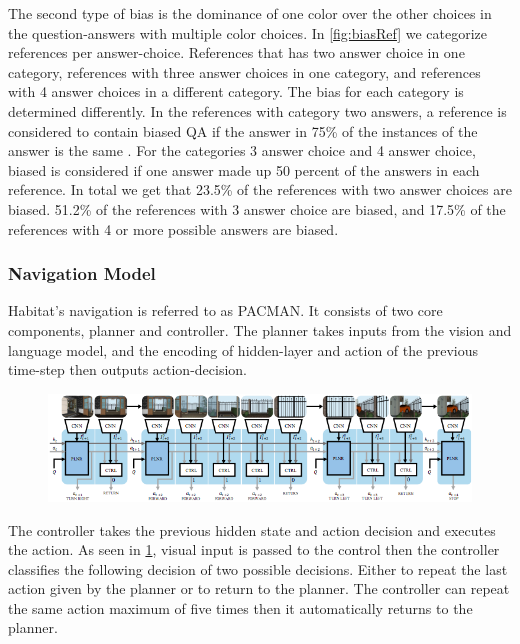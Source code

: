 The second type of bias is the dominance of one color over the other choices in the question-answers with multiple color choices. In \ref{fig:biasRef} we categorize references per answer-choice. References that has two answer choice in one category, references with three answer choices in one category, and references with 4 answer choices in a different category. The bias for each category is determined differently. In the references with category two answers, a reference is considered to contain biased QA if the answer in 75\% of the instances of the answer is the same . For the categories 3 answer choice and 4 answer choice, biased is considered if one answer made up 50 percent of the answers in each reference.  In total we get that 23.5\% of the references with two answer choices are biased. 51.2\% of the references with 3 answer choice are biased, and 17.5\% of the references with 4 or more possible answers are biased.


\subsubsection{Navigation Model}


Habitat's navigation is referred to as PACMAN. It consists of two core components, planner and controller. The planner takes inputs from the vision and language model, and the encoding of hidden-layer and action of the previous time-step then outputs action-decision. 

\begin{figure}[H]
\centering
\includegraphics[scale=0.53]{images/nav.png}
\caption{}
\label{fig:nav}
\end{figure}

The controller takes the previous hidden state and action decision and executes the action. As seen in \ref{fig:nav}, visual input is passed to the control then the controller classifies the following decision of two possible decisions. Either to repeat the last action given by the planner or to return to the planner. The controller can repeat the same action maximum of five times then it automatically returns to the planner. 

